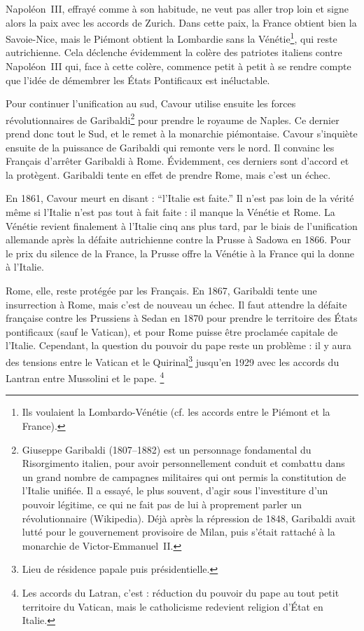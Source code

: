 \documentclass[12pt]{report}
\begin{document}
Napoléon~III, effrayé comme à son habitude, ne veut pas aller trop loin et signe alors la paix avec les accords de Zurich.
Dans cette paix, la France obtient bien la Savoie-Nice, mais le Piémont obtient la Lombardie sans la Vénétie\footnote{Ils voulaient la Lombardo-Vénétie (cf. les accords entre le Piémont et la France).}, qui reste autrichienne.
Cela déclenche évidemment la colère des patriotes italiens contre Napoléon~III qui, face à cette colère, commence petit à petit à se rendre compte que l'idée de démembrer les États Pontificaux est inéluctable.

Pour continuer l'unification au sud, Cavour utilise ensuite les forces révolutionnaires de Garibaldi\footnote{Giuseppe Garibaldi (1807--1882) est un personnage fondamental du Risorgimento italien, pour avoir personnellement conduit et combattu dans un grand nombre de campagnes militaires qui ont permis la constitution de l’Italie unifiée. Il a essayé, le plus souvent, d’agir sous l’investiture d’un pouvoir légitime, ce qui ne fait pas de lui à proprement parler un révolutionnaire (Wikipedia). Déjà après la répression de 1848, Garibaldi avait lutté pour le gouvernement provisoire de Milan, puis s'était rattaché à la monarchie de Victor-Emmanuel~II.} pour prendre le royaume de Naples.
Ce dernier prend donc tout le Sud, et le remet à la monarchie piémontaise.
Cavour s’inquiète ensuite de la puissance de Garibaldi qui remonte vers le nord.
Il convainc les Français d’arrêter Garibaldi à Rome. Évidemment, ces derniers sont d'accord et la protègent.
Garibaldi tente en effet de prendre Rome, mais c'est un échec.

En 1861, Cavour meurt en disant : \enquote{l’Italie est faite.}
Il n’est pas loin de la vérité même si l’Italie n’est pas tout à fait faite : il manque la Vénétie et Rome. 
La Vénétie revient finalement à l’Italie cinq ans plus tard, par le biais de l’unification allemande après la défaite autrichienne contre la Prusse à Sadowa en 1866. 
Pour le prix du silence de la France, la Prusse offre la Vénétie à la France qui la donne à l’Italie.

Rome, elle, reste protégée par les Français.
En 1867, Garibaldi tente une insurrection à Rome, mais c'est de nouveau un échec.
Il faut attendre la défaite française contre les Prussiens à Sedan en 1870 pour prendre le territoire des États pontificaux (sauf le Vatican), et pour Rome puisse être proclamée capitale de l'Italie.
Cependant, la question du pouvoir du pape reste un problème : il y aura des tensions entre le Vatican et le Quirinal\footnote{Lieu de résidence papale puis présidentielle.} jusqu'en 1929 avec les accords du Lantran entre Mussolini et le pape.
\footnote{Les accords du Latran, c'est : réduction du pouvoir du pape au tout petit territoire du Vatican, mais le catholicisme redevient religion d'État en Italie.}
\end{document}
